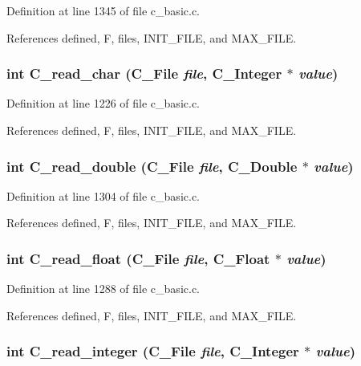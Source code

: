 Definition at line 1345 of file c\_\-basic.c.

References defined, F, files, INIT\_\-FILE, and MAX\_\-FILE.
\subsubsection{\setlength{\rightskip}{0pt plus 5cm}int C\_\-read\_\-char (\bf{C\_\-File} {\em file}, \bf{C\_\-Integer} $\ast$ {\em value})}\label{c__basic_8c_baadc7c497766b546221a015d0173b51}




Definition at line 1226 of file c\_\-basic.c.

References defined, F, files, INIT\_\-FILE, and MAX\_\-FILE.
\subsubsection{\setlength{\rightskip}{0pt plus 5cm}int C\_\-read\_\-double (\bf{C\_\-File} {\em file}, \bf{C\_\-Double} $\ast$ {\em value})}\label{c__basic_8c_ae3fc70d5bb1f959a1f5bd4cae2e4517}




Definition at line 1304 of file c\_\-basic.c.

References defined, F, files, INIT\_\-FILE, and MAX\_\-FILE.
\subsubsection{\setlength{\rightskip}{0pt plus 5cm}int C\_\-read\_\-float (\bf{C\_\-File} {\em file}, \bf{C\_\-Float} $\ast$ {\em value})}\label{c__basic_8c_332c79f40c5b2ea09db2eb3b3a8524c7}




Definition at line 1288 of file c\_\-basic.c.

References defined, F, files, INIT\_\-FILE, and MAX\_\-FILE.
\subsubsection{\setlength{\rightskip}{0pt plus 5cm}int C\_\-read\_\-integer (\bf{C\_\-File} {\em file}, \bf{C\_\-Integer} $\ast$ {\em value})}\label{c__basic_8c_a8011b1606a32daec8c4db9275637502}




